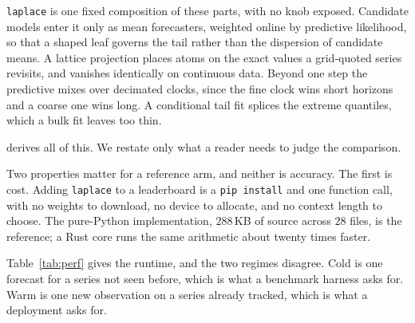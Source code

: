 \documentclass[article]{jss}
\providecommand{\proglang}[1]{\textsf{#1}}
\providecommand{\code}[1]{\texttt{#1}}
\begin{document}
\code{laplace} is one fixed composition of these parts, with no knob exposed.
Candidate models enter it only as mean forecasters, weighted online by
predictive likelihood, so that a shaped leaf governs the tail rather than the
dispersion of candidate means. A lattice projection places atoms on the exact
values a grid-quoted series revisits, and vanishes identically on continuous
data. Beyond one step the predictive mixes over decimated clocks, since the fine
clock wins short horizons and a coarse one wins long. A conditional tail fit
splices the extreme quantiles, which a bulk fit leaves too thin.

\citet{cotton2026transforms} derives all of this. We restate only what a reader
needs to judge the comparison.

Two properties matter for a reference arm, and neither is accuracy. The first is
cost. Adding \code{laplace} to a leaderboard is a \code{pip install} and one
function call, with no weights to download, no device to allocate, and no
context length to choose. The pure-\proglang{Python} implementation, $288$\,KB of source across $28$
files, is the reference; a \proglang{Rust} core runs the same arithmetic about
twenty times faster.

Table~\ref{tab:perf} gives the runtime, and the two regimes disagree. Cold is
one forecast for a series not seen before, which is what a benchmark harness
asks for. Warm is one new observation on a series already tracked, which is what
a deployment asks for.
\end{document}
